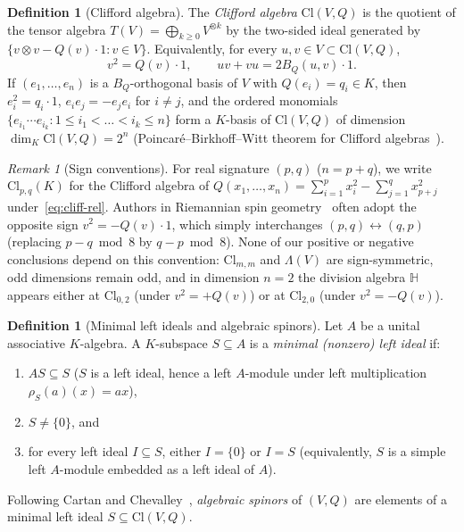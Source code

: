 \documentclass[11pt,a4paper]{article}
\theoremstyle{plain}
\theoremstyle{definition}
\newtheorem{definition}[theorem]{Definition}
\theoremstyle{remark}
\newtheorem{remark}[theorem]{Remark}
\newcommand{\Cl}{\mathrm{Cl}}
\begin{document}
\begin{definition}[Clifford algebra]
The \emph{Clifford algebra} $\Cl(V, Q)$ is the quotient of the tensor algebra $T(V) = \bigoplus_{k \ge 0} V^{\otimes k}$ by the two-sided ideal generated by $\{v \otimes v - Q(v)\cdot 1 : v \in V\}$. Equivalently, for every $u, v \in V \subset \Cl(V, Q)$,
\begin{equation}\label{eq:cliff-rel}
  v^2 = Q(v)\cdot 1, \qquad uv + vu = 2 B_Q(u, v)\cdot 1.
\end{equation}
If $(e_1, \dots, e_n)$ is a $B_Q$-orthogonal basis of $V$ with $Q(e_i) = q_i \in K$, then $e_i^2 = q_i \cdot 1$, $e_i e_j = -e_j e_i$ for $i \neq j$, and the ordered monomials $\{e_{i_1}\cdots e_{i_k} : 1 \le i_1 < \dots < i_k \le n\}$ form a $K$-basis of $\Cl(V, Q)$ of dimension $\dim_K \Cl(V, Q) = 2^n$ (Poincar\'e--Birkhoff--Witt theorem for Clifford algebras~\cite{Chevalley1954}).
\end{definition}

\begin{remark}[Sign conventions]
For real signature $(p, q)$ ($n = p + q$), we write $\Cl_{p,q}(K)$ for the Clifford algebra of $Q(x_1, \dots, x_n) = \sum_{i=1}^p x_i^2 - \sum_{j=1}^q x_{p+j}^2$ under~\eqref{eq:cliff-rel}. Authors in Riemannian spin geometry~\cite{LawsonMichelsohn1989} often adopt the opposite sign $v^2 = -Q(v)\cdot 1$, which simply interchanges $(p, q) \leftrightarrow (q, p)$ (replacing $p - q \bmod 8$ by $q - p \bmod 8$). None of our positive or negative conclusions depend on this convention: $\Cl_{m,m}$ and $\Lambda(V)$ are sign-symmetric, odd dimensions remain odd, and in dimension $n = 2$ the division algebra $\mathbb{H}$ appears either at $\Cl_{0,2}$ (under $v^2 = +Q(v)$) or at $\Cl_{2,0}$ (under $v^2 = -Q(v)$).
\end{remark}

\begin{definition}[Minimal left ideals and algebraic spinors]
Let $A$ be a unital associative $K$-algebra. A $K$-subspace $S \subseteq A$ is a \emph{minimal (nonzero) left ideal} if:
\begin{enumerate}
  \item $A S \subseteq S$ ($S$ is a left ideal, hence a left $A$-module under left multiplication $\rho_S(a)(x) = ax$),
  \item $S \neq \{0\}$, and
  \item for every left ideal $I \subseteq S$, either $I = \{0\}$ or $I = S$ (equivalently, $S$ is a simple left $A$-module embedded as a left ideal of $A$).
\end{enumerate}
Following Cartan and Chevalley~\cite{Chevalley1954,Lounesto2001}, \emph{algebraic spinors} of $(V, Q)$ are elements of a minimal left ideal $S \subseteq \Cl(V, Q)$.
\end{definition}
\end{document}
